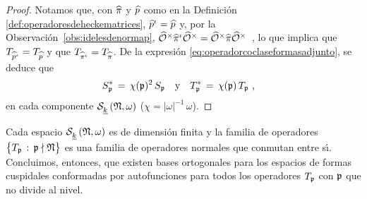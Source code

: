 \begin{proof}
	Notamos que, con $\hhat{\pi}$ y $\hhat{p}$ como en la Definici\'{o}n
	\ref{def:operadoresdeheckematrices}, $\hhat{p}^\iota=\hhat{p}$ y, por
	la Observaci\'{o}n~\ref{obs:idelesdenormap},
	\begin{math}
		\Idfin{\cal{O}}\hhat{\pi}^\iota\Idfin{\cal{O}}=
			\Idfin{\cal{O}}\hhat{\pi}\Idfin{\cal{O}}
	\end{math}~, lo que implica que $T_{\hhat{p}^\iota}=T_{\hhat{p}}$ y que
	$T_{\hhat{\pi}^\iota}=T_{\hhat{\pi}}$. De la expresi\'{o}n
	\eqref{eq:operadorcoclaseformasadjunto}, se deduce que
	\begin{align*}
		S_{\frak{p}}^{*} \,=\,\chi(\frak{p})^{2}\,S_{\frak{p}}
			&\quad\text{y}\quad
		T_{\frak{p}}^{*} \,=\,\chi(\frak{p})\,T_{\frak{p}}
		\text{ ,}
	\end{align*}
	en cada componente $\spitzH{k}{\frak{N},\omega}$
	($\chi=|\omega|^{-1}\,\omega$).
\end{proof}

Cada espacio $\spitzH{k}{\frak{N},\omega}$ es de dimensi\'{o}n finita y la
familia de operadores $\big\{T_{\frak{p}}\,:\,\frak{p}\nmid\frak{N}\big\}$ es
una familia de operadores normales que conmutan entre s\'{\i}. Concluimos,
entonces, que existen bases ortogonales para los espacios de formas cuspidales
conformadas por autofunciones para todos los operadores $T_{\frak{p}}$ con
$\frak{p}$ que no divide al nivel.
